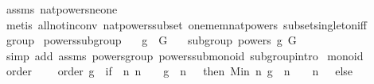 \begin{isabellebody}
\ assms\ nat{\isacharunderscore}{\kern0pt}powers{\isacharunderscore}{\kern0pt}ne{\isacharunderscore}{\kern0pt}one\ \isanewline
\ \ \isamarkupfalse%
\ {\isacharparenleft}{\kern0pt}metis\ all{\isacharunderscore}{\kern0pt}not{\isacharunderscore}{\kern0pt}in{\isacharunderscore}{\kern0pt}conv\ nat{\isacharunderscore}{\kern0pt}powers{\isacharunderscore}{\kern0pt}subset\ one{\isacharunderscore}{\kern0pt}mem{\isacharunderscore}{\kern0pt}nat{\isacharunderscore}{\kern0pt}powers\ subset{\isacharunderscore}{\kern0pt}singleton{\isacharunderscore}{\kern0pt}iff{\isacharparenright}{\kern0pt}%
\endisatagproof
{\isafoldproof}%
%
\isadelimproof
%
\endisadelimproof
\isanewline
\isanewline
{}\isamarkupfalse%
\isanewline
\isanewline
{}\isamarkupfalse%
\ group\isanewline
\isanewline
{}\isanewline
\isanewline
{}\isamarkupfalse%
\ powers{\isacharunderscore}{\kern0pt}subgroup{\isacharcolon}{\kern0pt}\isanewline
\ \ \ {\isachardoublequoteopen}g\ {\isasymin}\ G{\isachardoublequoteclose}\isanewline
\ \ \ {\isachardoublequoteopen}subgroup\ {\isacharparenleft}{\kern0pt}powers\ g{\isacharparenright}{\kern0pt}\ G\ {\isacharparenleft}{\kern0pt}{\isasymcdot}{\isacharparenright}{\kern0pt}\ {\isasymone}{\isachardoublequoteclose}\ \isanewline
%
\isadelimproof
\ \ %
\endisadelimproof
%
\isatagproof
{}\isamarkupfalse%
\ {\isacharparenleft}{\kern0pt}simp\ add{\isacharcolon}{\kern0pt}\ assms\ powers{\isacharunderscore}{\kern0pt}group\ powers{\isacharunderscore}{\kern0pt}submonoid\ subgroup{\isachardot}{\kern0pt}intro{\isacharparenright}{\kern0pt}%
\endisatagproof
{\isafoldproof}%
%
\isadelimproof
\isanewline
%
\endisadelimproof
\isanewline
{}\isamarkupfalse%
\isanewline
\isanewline
{}\isamarkupfalse%
\ monoid\isanewline
\isanewline
{}%
\isadelimdocument
%
\endisadelimdocument
%
\isatagdocument
%
\isamarkuptrue%
%
\endisatagdocument
{\isafolddocument}%
%
\isadelimdocument
%
\endisadelimdocument
{}\isamarkupfalse%
\ order\ \isanewline
\ \ \ {\isachardoublequoteopen}order\ g\ {\isacharequal}{\kern0pt}\ {\isacharparenleft}{\kern0pt}if\ {\isacharparenleft}{\kern0pt}{\isasymexists}\ n{\isachardot}{\kern0pt}\ n\ {\isachargreater}{\kern0pt}\ {}\ {\isasymand}\ g\ {\isacharcircum}{\kern0pt}\ n\ {\isacharequal}{\kern0pt}\ {\isasymone}{\isacharparenright}{\kern0pt}\ then\ Min\ {\isacharbraceleft}{\kern0pt}n{\isachardot}{\kern0pt}\ g\ {\isacharcircum}{\kern0pt}\ n\ {\isacharequal}{\kern0pt}\ {\isasymone}\ {\isasymand}\ n\ {\isachargreater}{\kern0pt}\ {}{\isacharbraceright}{\kern0pt}\ else\ {}{\isacharparenright}{\kern0pt}{\isachardoublequoteclose}\isanewline

\end{isabellebody}
